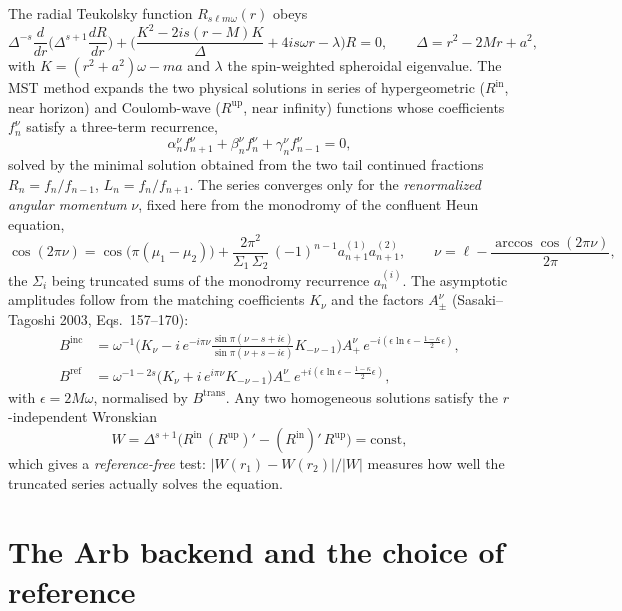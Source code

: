 \documentclass[12pt,a4paper]{article}
\newcommand{\Binc}{B^{\mathrm{inc}}}
\newcommand{\Bref}{B^{\mathrm{ref}}}
\newcommand{\Rin}{R^{\mathrm{in}}}
\newcommand{\Rup}{R^{\mathrm{up}}}
\newcommand{\eps}{\epsilon}
\begin{document}
The radial Teukolsky function $R_{s\ell m\omega}(r)$ obeys
\begin{equation}
  \Delta^{-s}\frac{d}{dr}\!\Big(\Delta^{s+1}\frac{dR}{dr}\Big)
  +\Big(\frac{K^2-2is(r-M)K}{\Delta}+4is\omega r-\lambda\Big)R=0,
  \qquad \Delta=r^2-2Mr+a^2,
\end{equation}
with $K=(r^2+a^2)\omega-ma$ and $\lambda$ the spin-weighted spheroidal eigenvalue.
The MST method expands the two physical solutions in series of hypergeometric
($\Rin$, near horizon) and Coulomb-wave ($\Rup$, near infinity) functions whose
coefficients $f^\nu_n$ satisfy a three-term recurrence,
\begin{equation}
  \alpha^\nu_n f^\nu_{n+1}+\beta^\nu_n f^\nu_n+\gamma^\nu_n f^\nu_{n-1}=0,
  \label{eq:rec}
\end{equation}
solved by the minimal solution obtained from the two tail continued fractions
$R_n=f_n/f_{n-1}$, $L_n=f_n/f_{n+1}$.  The series converges only for the
\emph{renormalized angular momentum} $\nu$, fixed here from the monodromy of the
confluent Heun equation,
\begin{equation}
  \cos(2\pi\nu)=\cos\!\big(\pi(\mu_1-\mu_2)\big)
  +\frac{2\pi^2}{\Sigma_1\,\Sigma_2}\,(-1)^{n-1}a^{(1)}_{n+1}a^{(2)}_{n+1},
  \qquad
  \nu=\ell-\frac{\arccos\cos(2\pi\nu)}{2\pi},
  \label{eq:mono}
\end{equation}
the $\Sigma_i$ being truncated sums of the monodromy recurrence
$a^{(i)}_n$.  The asymptotic amplitudes follow from the matching coefficients
$K_\nu$ and the factors $A^\nu_\pm$ (Sasaki--Tagoshi 2003, Eqs.~157--170):
\begin{align}
  \Binc&=\omega^{-1}\Big(K_\nu-i\,e^{-i\pi\nu}
        \tfrac{\sin\pi(\nu-s+i\eps)}{\sin\pi(\nu+s-i\eps)}K_{-\nu-1}\Big)
        A^\nu_+\,e^{-i(\eps\ln\eps-\frac{1-\kappa}{2}\eps)},\\
  \Bref&=\omega^{-1-2s}\big(K_\nu+i\,e^{i\pi\nu}K_{-\nu-1}\big)
        A^\nu_-\,e^{+i(\eps\ln\eps-\frac{1-\kappa}{2}\eps)},
\end{align}
with $\eps=2M\omega$, normalised by $B^{\mathrm{trans}}$.  Any two homogeneous
solutions satisfy the $r$-independent Wronskian
\begin{equation}
  W=\Delta^{s+1}\big(\Rin\,(\Rup)'-(\Rin)'\,\Rup\big)=\text{const},
  \label{eq:wron}
\end{equation}
which gives a \emph{reference-free} test: $|W(r_1)-W(r_2)|/|W|$ measures how well
the truncated series actually solves the equation.

\section{The Arb backend and the choice of reference}
\end{document}
